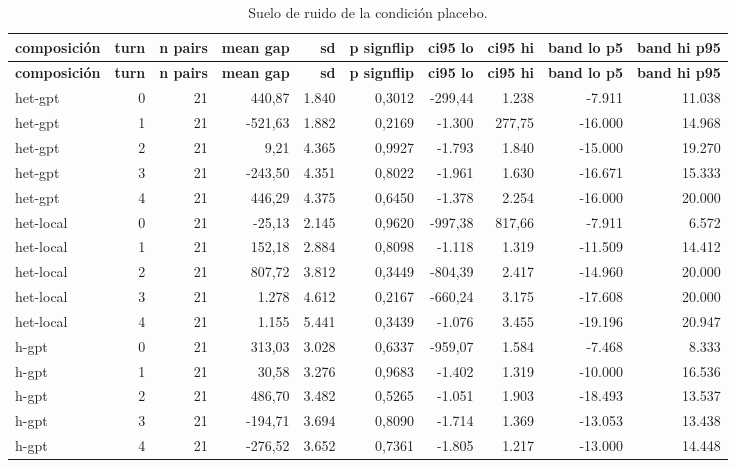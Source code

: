 \begin{landscape}
\scriptsize
\begin{longtable}{lrrrrrrrrr}
\caption{Suelo de ruido de la condición placebo.}\label{tab:t02}\\
\hline
\textbf{composición} & \textbf{turn} & \textbf{n pairs} & \textbf{mean gap} & \textbf{sd} & \textbf{p signflip} & \textbf{ci95 lo} & \textbf{ci95 hi} & \textbf{band lo p5} & \textbf{band hi p95} \\
\hline
\endfirsthead
\hline
\textbf{composición} & \textbf{turn} & \textbf{n pairs} & \textbf{mean gap} & \textbf{sd} & \textbf{p signflip} & \textbf{ci95 lo} & \textbf{ci95 hi} & \textbf{band lo p5} & \textbf{band hi p95} \\
\hline
\endhead
\hline
\endfoot
het-gpt & 0 & 21 & 440,87 & 1.840 & 0,3012 & -299,44 & 1.238 & -7.911 & 11.038 \\
het-gpt & 1 & 21 & -521,63 & 1.882 & 0,2169 & -1.300 & 277,75 & -16.000 & 14.968 \\
het-gpt & 2 & 21 & 9,21 & 4.365 & 0,9927 & -1.793 & 1.840 & -15.000 & 19.270 \\
het-gpt & 3 & 21 & -243,50 & 4.351 & 0,8022 & -1.961 & 1.630 & -16.671 & 15.333 \\
het-gpt & 4 & 21 & 446,29 & 4.375 & 0,6450 & -1.378 & 2.254 & -16.000 & 20.000 \\
het-local & 0 & 21 & -25,13 & 2.145 & 0,9620 & -997,38 & 817,66 & -7.911 & 6.572 \\
het-local & 1 & 21 & 152,18 & 2.884 & 0,8098 & -1.118 & 1.319 & -11.509 & 14.412 \\
het-local & 2 & 21 & 807,72 & 3.812 & 0,3449 & -804,39 & 2.417 & -14.960 & 20.000 \\
het-local & 3 & 21 & 1.278 & 4.612 & 0,2167 & -660,24 & 3.175 & -17.608 & 20.000 \\
het-local & 4 & 21 & 1.155 & 5.441 & 0,3439 & -1.076 & 3.455 & -19.196 & 20.947 \\
h-gpt & 0 & 21 & 313,03 & 3.028 & 0,6337 & -959,07 & 1.584 & -7.468 & 8.333 \\
h-gpt & 1 & 21 & 30,58 & 3.276 & 0,9683 & -1.402 & 1.319 & -10.000 & 16.536 \\
h-gpt & 2 & 21 & 486,70 & 3.482 & 0,5265 & -1.051 & 1.903 & -18.493 & 13.537 \\
h-gpt & 3 & 21 & -194,71 & 3.694 & 0,8090 & -1.714 & 1.369 & -13.053 & 13.438 \\
h-gpt & 4 & 21 & -276,52 & 3.652 & 0,7361 & -1.805 & 1.217 & -13.000 & 14.448 \\

\end{longtable}
\end{landscape}
